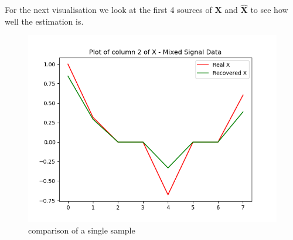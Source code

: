 For the next visualisation we look at the first 4 sources of $\mathbf{X}$ and $\hat{\mathbf{X}}$ to see how well the estimation is.
\begin{figure}[H]
\centering
\includegraphics[width=\textwidth]{figures/cases/case2_2.png}
\caption{comparison of a single sample}
\label{fig:case2_sample}
\end{figure}
\noindent
